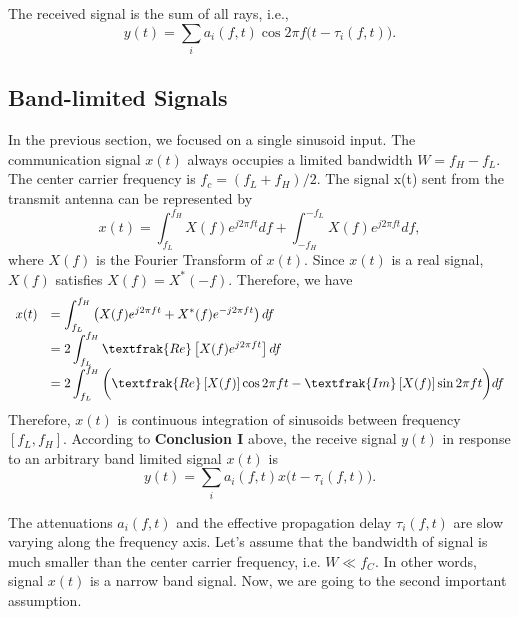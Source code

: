 \documentclass[letterpaper,11pt]{article}
\begin{document}
The received signal is the sum of all rays, i.e.,
\begin{equation}
y(t)=\displaystyle\sum_i a_i(f,t)\cos2\pi f\big(t-\tau_i(f, t)\big).
\end{equation}



\subsection{Band-limited Signals}

In the previous section, we focused on a single sinusoid input. The communication signal $x(t)$ always occupies a limited bandwidth $W=f_H-f_L$. The center carrier frequency is $f_c=(f_L+f_H)/2$. The signal x(t) sent from the transmit antenna can be represented by 
\begin{equation}
\displaystyle x(t)=\int_{f_L}^{f_H}X(f)e^{j2\pi ft}df+\int_{-f_H}^{-f_L}X(f)e^{j2\pi ft}df,
\end{equation}
where $X(f)$ is the Fourier Transform of $x(t)$. Since $x(t)$ is a real signal, $X(f)$ satisfies $X(f)=X^{*}(-f)$. Therefore, we have
\begin{equation}
\begin{array}{rl}
\displaystyle x(t)&=\displaystyle \int_{f_L}^{f_H}\left(X(f)e^{j2\pi ft}+X^{*}(f)e^{-j2\pi ft}\right)df\\
\displaystyle &=\displaystyle 2\int_{f_L}^{f_H}{\textfrak{Re}}\left[X(f)e^{j2\pi ft}\right]df\\
&=\displaystyle 2\int_{f_L}^{f_H}\bigg({\textfrak{Re}}\left[X(f)\right]\cos2\pi ft-{\textfrak{Im}}\left[X(f)\right]\sin2\pi ft\bigg)df\\
\end{array}
\end{equation}
Therefore, $x(t)$ is continuous integration of sinusoids between frequency $[f_L, f_H]$. According to \textbf{Conclusion I} above, the receive signal $y(t)$ in response to an arbitrary band limited signal $x(t)$ is 
\begin{equation}\label{frq_dependent}
y(t)=\displaystyle\sum_i a_i(f,t)x\big(t-\tau_i(f, t)\big).
\end{equation}

The attenuations $a_i(f,t)$ and the effective propagation delay $\tau_i(f,t)$ are slow varying along the frequency axis. Let's assume  that the bandwidth of signal is much smaller than the center carrier frequency, i.e. $W\ll f_C$. In other words, signal $x(t)$ is a narrow band signal. Now, we are going to the second important assumption. \\
\end{document}

